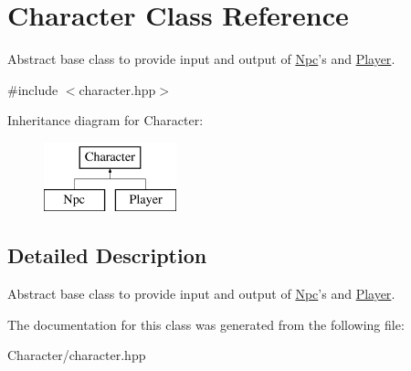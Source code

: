 \hypertarget{classCharacter}{\section{Character Class Reference}
\label{classCharacter}
}


Abstract base class to provide input and output of \hyperlink{classNpc}{Npc}'s and \hyperlink{classPlayer}{Player}.  




{\ttfamily \#include $<$character.\-hpp$>$}

Inheritance diagram for Character\-:\begin{figure}[H]
\begin{center}
\leavevmode
\includegraphics[height=2.000000cm]{classCharacter}
\end{center}
\end{figure}


\subsection{Detailed Description}
Abstract base class to provide input and output of \hyperlink{classNpc}{Npc}'s and \hyperlink{classPlayer}{Player}. 

The documentation for this class was generated from the following file\-:\begin{DoxyCompactItemize}
\item 
Character/character.\-hpp\end{DoxyCompactItemize}
